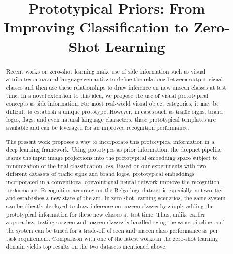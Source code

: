 \documentclass{bmvc2k}
\title{Prototypical Priors: From Improving Classification to Zero-Shot Learning}
\begin{document}
\maketitle

\begin{abstract}
Recent works on zero-shot learning make use of side information such
as visual attributes or natural language semantics to define the relations
between output visual classes and then use these relationships to draw inference
on new unseen classes at test time. In a novel extension to this idea,
we propose the use of visual prototypical concepts as side information. For
most real-world visual object categories, it may be difficult to establish
a unique prototype. However, in cases such as traffic signs, brand
logos, flags, and even natural language characters, these prototypical
templates are available and can be leveraged for an improved recognition
performance. 


The present work proposes a way to incorporate this prototypical information
in a deep learning framework. Using prototypes as prior information, the deepnet pipeline
learns the input image projections into the prototypical embedding space subject
to minimization of the final classification loss. Based on our
experiments with two different datasets of traffic signs and brand
logos, prototypical embeddings incorporated in a conventional convolutional neural network improve
the recognition performance. Recognition accuracy on the Belga logo dataset is
especially noteworthy and establishes a new state-of-the-art. In zero-shot
learning scenarios, the same system can be directly deployed to draw inference on unseen classes by simply adding the prototypical information 
for these new classes at test time. Thus, unlike earlier approaches, testing
on seen and unseen classes is handled using the same pipeline, and the system
can be tuned for a trade-off of seen and unseen class performance as per 
task requirement. Comparison with one of the latest works in the zero-shot
learning domain yields top results on the two datasets mentioned above.

\end{abstract}
\end{document}
